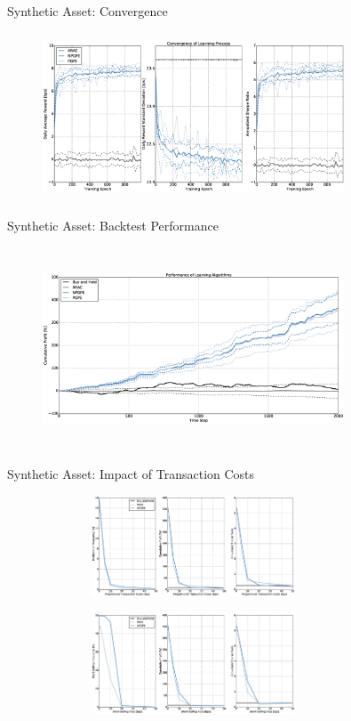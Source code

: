 \begin{frame}[c]{Synthetic Asset: Convergence}
\begin{figure}[t!]
	\centering
	\includegraphics[height=5cm,width=0.8\textwidth]{Images/6_0_single_synthetic_neutral_convergence}
\end{figure}
\end{frame}


\begin{frame}[c]{Synthetic Asset: Backtest Performance}
\begin{figure}[t]
	\centering
	\includegraphics[height=6cm,width=0.8\textwidth]{Images/6_1_single_synthetic_neutral_performance}
\end{figure}
\end{frame}

\begin{frame}[c]{Synthetic Asset: Impact of Transaction Costs}
\begin{figure}[t!]
	\centering
	\includegraphics[height=3cm,width=0.8\textwidth]{Images/6_2_impact_transaction_costs}
\end{figure}
\begin{figure}[t!]
	\centering
	\includegraphics[height=3cm,width=0.8\textwidth]{Images/6_3_impact_short_selling_fees}
\end{figure}
\end{frame}

